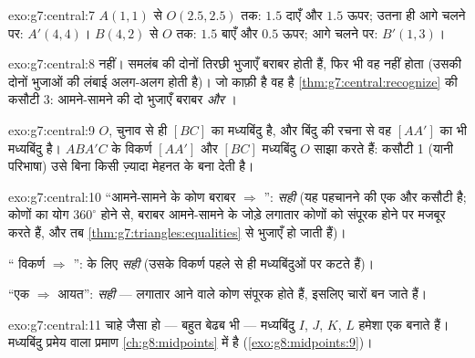 \begin{solution}{exo:g7:central:7}
$A(1,1)$ से $O(2.5, 2.5)$ तक: $1.5$ दाएँ और $1.5$ ऊपर; उतना ही आगे
चलने पर: $A'(4, 4)$। $B(4,2)$ से $O$ तक: $1.5$ बाएँ और $0.5$ ऊपर;
आगे चलने पर: $B'(1, 3)$।
\end{solution}

\begin{solution}{exo:g7:central:8}
नहीं।  समलंब की दोनों तिरछी भुजाएँ बराबर होती हैं, फिर भी
वह  नहीं होता (उसकी दोनों  भुजाओं की लंबाई
अलग-अलग होती है)। जो काफ़ी है वह है
\cref{thm:g7:central:recognize} की कसौटी 3: आमने-सामने की दो
भुजाएँ बराबर \emph{और }।
\end{solution}

\begin{solution}{exo:g7:central:9}
$O$, चुनाव से ही $[BC]$ का मध्यबिंदु है, और  बिंदु की रचना से
वह $[AA']$ का भी मध्यबिंदु है।  $ABA'C$ के विकर्ण $[AA']$
और $[BC]$ मध्यबिंदु $O$ साझा करते हैं: कसौटी 1 (यानी परिभाषा) उसे
बिना किसी ज़्यादा मेहनत के  बना देती है।
\end{solution}

\begin{solution}{exo:g7:central:10}
``आमने-सामने के कोण बराबर $\Rightarrow$ '':
\emph{सही} (यह पहचानने की एक और कसौटी है; कोणों का योग $360^\circ$
होने से, बराबर आमने-सामने के जोड़े लगातार कोणों को संपूरक होने पर
मजबूर करते हैं, और तब \cref{thm:g7:triangles:equalities} से भुजाएँ
 हो जाती हैं)।

`` विकर्ण $\Rightarrow$ '':  के लिए
\emph{सही} (उसके विकर्ण पहले से ही मध्यबिंदुओं पर कटते हैं)।

``एक  $\Rightarrow$ आयत'': \emph{सही} --- लगातार आने वाले कोण
संपूरक होते हैं, इसलिए चारों  बन जाते हैं।
\end{solution}

\begin{solution}{exo:g7:central:11}
 चाहे जैसा हो --- बहुत बेढब भी --- मध्यबिंदु $I$, $J$, $K$,
$L$ हमेशा एक \emph{} बनाते हैं। मध्यबिंदु प्रमेय
वाला प्रमाण \cref{ch:g8:midpoints} में है
(\cref{exo:g8:midpoints:9})।
\end{solution}

